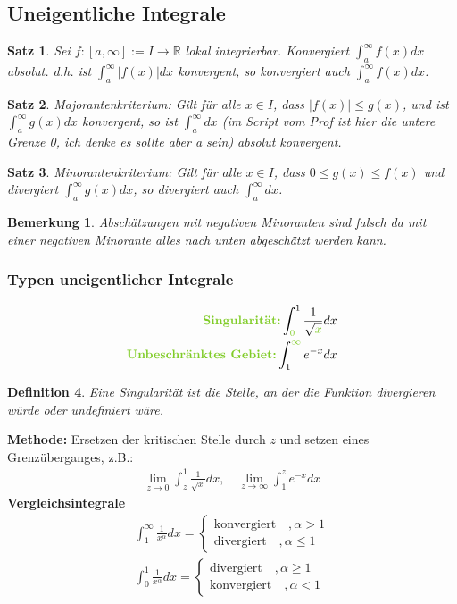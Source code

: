 \documentclass[12pt,a4paper]{report}%
\newtheorem{satz}{Satz}[section]
\newtheorem{definition}[satz]{Definition}
\newtheorem{bem}{Bemerkung}[section]
\numberwithin{equation}{section}
\newcommand{\R}{\mathbb{R}} %
\def\colGreen#1{\begingroup\color{LimeGreen}{#1}\endgroup}
\numberwithin{equation}{subsection}
\begin{document}
\subsection{Uneigentliche Integrale}
  \begin{satz}
    Sei $f:[a, \infty] := I \rightarrow \R$ lokal integrierbar. Konvergiert $\int_a^\infty f(x) dx$ absolut. d.h. ist $\int_a^\infty |f(x)| dx$ konvergent, so konvergiert auch $\int_a^\infty f(x) dx$.
  \end{satz}
  \begin{satz}
    Majorantenkriterium: Gilt für alle $x\in I$, dass $|f(x)| \leq g(x)$, und ist $\int_a^\infty g(x) dx$ konvergent, so ist $\int_a^\infty dx$ (im Script vom Prof ist hier die untere Grenze 0, ich denke es sollte aber a sein) absolut konvergent.    
  \end{satz}
  \begin{satz}
    Minorantenkriterium: Gilt für alle $x\in I$, dass $0 \leq g(x) \leq f(x)$ und divergiert $\int_a^\infty g(x) dx$, so divergiert auch $\int_a^\infty dx$.
  \end{satz}
  \begin{bem}
    Abschätzungen mit negativen Minoranten sind falsch da mit einer negativen Minorante alles nach unten abgeschätzt werden kann.
  \end{bem}
  \subsubsection{Typen uneigentlicher Integrale}
  \begin{align}
    \textbf{\colGreen{Singularität:} }\int_{\colGreen{0}}^1 \frac{1}{\sqrt{\colGreen{x}}} dx \nonumber \\
    \textbf{\colGreen{Unbeschränktes Gebiet:} }\int_1^{\colGreen{\infty}} e^{-x} dx \nonumber \\
  \end{align}
  \begin{definition}
    Eine Singularität ist die Stelle, an der die Funktion divergieren würde oder undefiniert wäre.
  \end{definition}
  \textbf{Methode:} Ersetzen der kritischen Stelle durch $z$ und setzen eines Grenzüberganges, z.B.:
  \begin{align*}
    \lim\limits_{z\rightarrow0} \int_z^1 \frac{1}{\sqrt{x}} dx, \quad \lim\limits_{z\rightarrow \infty} \int_1^z e^{-x} dx
  \end{align*}
  \textbf{Vergleichsintegrale}
  \begin{align}
    \int_1^\infty \frac{1}{x^\alpha} dx = 
    \begin{cases}
      \text{konvergiert}\quad , \alpha > 1 \\
      \text{divergiert}\quad , \alpha \leq 1
    \end{cases} \nonumber\\
    \int_0^1 \frac{1}{x^\alpha} dx = 
    \begin{cases}
      \text{divergiert}\quad , \alpha \geq 1 \\
      \text{konvergiert}\quad , \alpha < 1
    \end{cases} \nonumber\\    
  \end{align}
\end{document}
